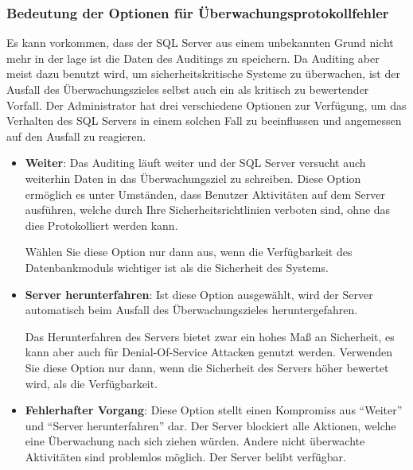         \subsubsection{Bedeutung der Optionen für Überwachungsprotokollfehler}
          Es kann vorkommen, dass der SQL Server aus einem unbekannten Grund
          nicht mehr in der lage ist die Daten des Auditings zu speichern. Da
          Auditing aber meist dazu benutzt wird, um sicherheitskritische
          Systeme zu überwachen, ist der Ausfall des Überwachungszieles selbst
          auch ein als kritisch zu bewertender Vorfall. Der Administrator hat
          drei verschiedene Optionen zur Verfügung, um das Verhalten des SQL
          Servers in einem solchen Fall zu beeinflussen und angemessen auf den
          Ausfall zu reagieren.
          \begin{itemize}
            \item \textbf{Weiter}: Das Auditing läuft weiter und der SQL Server
            versucht auch weiterhin Daten in das Überwachungsziel zu schreiben.
            Diese Option ermöglich es unter Umständen, dass Benutzer Aktivitäten
            auf dem Server ausführen, welche durch Ihre Sicherheitsrichtlinien
            verboten sind, ohne das dies Protokolliert werden kann.
            \begin{merke}
              Wählen Sie diese Option nur dann aus, wenn die Verfügbarkeit des
              Datenbankmoduls wichtiger ist als die Sicherheit des Systems.
            \end{merke}
            \item \textbf{Server herunterfahren}: Ist diese Option ausgewählt,
            wird der Server automatisch beim Ausfall des Überwachungszieles
            heruntergefahren.
            \begin{merke}
              Das Herunterfahren des Servers bietet zwar ein hohes Maß an
              Sicherheit, es kann aber auch für Denial-Of-Service Attacken
              genutzt werden. Verwenden Sie diese Option nur dann, wenn die
              Sicherheit des Servers höher bewertet wird, als die Verfügbarkeit.
            \end{merke}
            \item \textbf{Fehlerhafter Vorgang}: Diese Option stellt einen
            Kompromiss aus \enquote{Weiter} und \enquote{Server herunterfahren}
            dar. Der Server blockiert alle Aktionen, welche eine Überwachung
            nach sich ziehen würden. Andere nicht überwachte Aktivitäten sind
            problemlos möglich. Der Server belibt verfügbar.
          \end{itemize}
          \begin{literaturinternet}
            \item \cite{cc280525}
          \end{literaturinternet}
